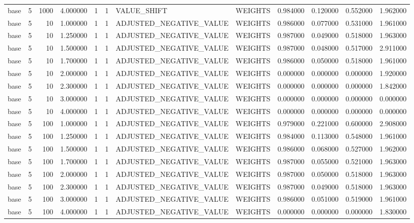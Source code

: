\begin{tabular}{lrrrllllrrrr}
base & 5 & 1000 & 4.000000 & 1 & 1 & VALUE_SHIFT & WEIGHTS & 0.984000 & 0.120000 & 0.552000 & 1.962000 \\
base & 5 & 10 & 1.000000 & 1 & 1 & ADJUSTED_NEGATIVE_VALUE & WEIGHTS & 0.986000 & 0.077000 & 0.531000 & 1.961000 \\
base & 5 & 10 & 1.250000 & 1 & 1 & ADJUSTED_NEGATIVE_VALUE & WEIGHTS & 0.987000 & 0.049000 & 0.518000 & 1.963000 \\
base & 5 & 10 & 1.500000 & 1 & 1 & ADJUSTED_NEGATIVE_VALUE & WEIGHTS & 0.987000 & 0.048000 & 0.517000 & 2.911000 \\
base & 5 & 10 & 1.700000 & 1 & 1 & ADJUSTED_NEGATIVE_VALUE & WEIGHTS & 0.986000 & 0.050000 & 0.518000 & 1.961000 \\
base & 5 & 10 & 2.000000 & 1 & 1 & ADJUSTED_NEGATIVE_VALUE & WEIGHTS & 0.000000 & 0.000000 & 0.000000 & 1.920000 \\
base & 5 & 10 & 2.300000 & 1 & 1 & ADJUSTED_NEGATIVE_VALUE & WEIGHTS & 0.000000 & 0.000000 & 0.000000 & 1.842000 \\
base & 5 & 10 & 3.000000 & 1 & 1 & ADJUSTED_NEGATIVE_VALUE & WEIGHTS & 0.000000 & 0.000000 & 0.000000 & 0.000000 \\
base & 5 & 10 & 4.000000 & 1 & 1 & ADJUSTED_NEGATIVE_VALUE & WEIGHTS & 0.000000 & 0.000000 & 0.000000 & 0.000000 \\
base & 5 & 100 & 1.000000 & 1 & 1 & ADJUSTED_NEGATIVE_VALUE & WEIGHTS & 0.979000 & 0.221000 & 0.600000 & 2.908000 \\
base & 5 & 100 & 1.250000 & 1 & 1 & ADJUSTED_NEGATIVE_VALUE & WEIGHTS & 0.984000 & 0.113000 & 0.548000 & 1.961000 \\
base & 5 & 100 & 1.500000 & 1 & 1 & ADJUSTED_NEGATIVE_VALUE & WEIGHTS & 0.986000 & 0.068000 & 0.527000 & 1.962000 \\
base & 5 & 100 & 1.700000 & 1 & 1 & ADJUSTED_NEGATIVE_VALUE & WEIGHTS & 0.987000 & 0.055000 & 0.521000 & 1.963000 \\
base & 5 & 100 & 2.000000 & 1 & 1 & ADJUSTED_NEGATIVE_VALUE & WEIGHTS & 0.987000 & 0.050000 & 0.518000 & 1.963000 \\
base & 5 & 100 & 2.300000 & 1 & 1 & ADJUSTED_NEGATIVE_VALUE & WEIGHTS & 0.987000 & 0.049000 & 0.518000 & 1.963000 \\
base & 5 & 100 & 3.000000 & 1 & 1 & ADJUSTED_NEGATIVE_VALUE & WEIGHTS & 0.986000 & 0.051000 & 0.519000 & 1.961000 \\
base & 5 & 100 & 4.000000 & 1 & 1 & ADJUSTED_NEGATIVE_VALUE & WEIGHTS & 0.000000 & 0.000000 & 0.000000 & 1.830000 \\

\end{tabular}
